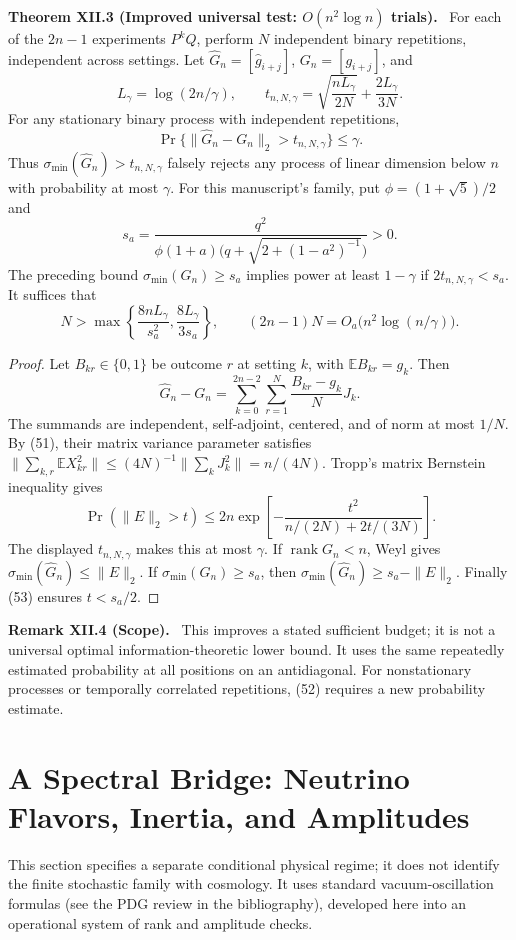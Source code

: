 \documentclass[11pt,a4paper,oneside]{book}
\DeclareMathOperator{\rank}{rank}\DeclareMathOperator{\Tr}{Tr}
\newcommand{\statement}[3]{\par\medskip\noindent\textbf{#1 #2 (#3).}\ }
\begin{document}
\statement{Theorem}{XII.3}{Improved universal test: $O(n^2\log n)$ trials} For each of the $2n-1$ experiments $P^kQ$, perform $N$ independent binary repetitions, independent across settings. Let $\widehat G_n=[\widehat g_{i+j}]$, $G_n=[g_{i+j}]$, and
\[L_\gamma=\log(2n/\gamma),\qquad t_{n,N,\gamma}=\sqrt{\frac{nL_\gamma}{2N}}+\frac{2L_\gamma}{3N}.\]
For any stationary binary process with independent repetitions,
\begin{equation}\Pr\{\|\widehat G_n-G_n\|_2>t_{n,N,\gamma}\}\le\gamma.\tag{52}\end{equation}
Thus $\sigma_{\min}(\widehat G_n)>t_{n,N,\gamma}$ falsely rejects any process of linear dimension below $n$ with probability at most $\gamma$. For this manuscript's family, put $\phi=(1+\sqrt5)/2$ and
\[s_a=\frac{q^2}{\phi(1+a)\bigl(q+\sqrt{2+(1-a^2)^{-1}}\bigr)}>0.\]
The preceding bound $\sigma_{\min}(G_n)\ge s_a$ implies power at least $1-\gamma$ if $2t_{n,N,\gamma}<s_a$. It suffices that
\begin{equation}N>\max\left\{\frac{8nL_\gamma}{s_a^2},\frac{8L_\gamma}{3s_a}\right\},\qquad(2n-1)N=O_a\bigl(n^2\log(n/\gamma)\bigr).\tag{53}\end{equation}
\begin{proof}Let $B_{kr}\in\{0,1\}$ be outcome $r$ at setting $k$, with $\mathbb EB_{kr}=g_k$. Then
\[\widehat G_n-G_n=\sum_{k=0}^{2n-2}\sum_{r=1}^N\frac{B_{kr}-g_k}{N}J_k.\]
The summands are independent, self-adjoint, centered, and of norm at most $1/N$. By (51), their matrix variance parameter satisfies $\|\sum_{k,r}\mathbb EX_{kr}^2\|\le(4N)^{-1}\|\sum_kJ_k^2\|=n/(4N)$. Tropp's matrix Bernstein inequality gives
\[\Pr(\|E\|_2>t)\le2n\exp\left[-\frac{t^2}{n/(2N)+2t/(3N)}\right].\]
The displayed $t_{n,N,\gamma}$ makes this at most $\gamma$. If $\rank G_n<n$, Weyl gives $\sigma_{\min}(\widehat G_n)\le\|E\|_2$. If $\sigma_{\min}(G_n)\ge s_a$, then $\sigma_{\min}(\widehat G_n)\ge s_a-\|E\|_2$. Finally (53) ensures $t<s_a/2$.\end{proof}
\statement{Remark}{XII.4}{Scope} This improves a stated sufficient budget; it is not a universal optimal information-theoretic lower bound. It uses the same repeatedly estimated probability at all positions on an antidiagonal. For nonstationary processes or temporally correlated repetitions, (52) requires a new probability estimate.
\setcounter{equation}{53}


\chapter{A Spectral Bridge: Neutrino Flavors, Inertia, and Amplitudes}
This section specifies a separate conditional physical regime; it does not identify the finite stochastic family with cosmology. It uses standard vacuum-oscillation formulas (see the PDG review in the bibliography), developed here into an operational system of rank and amplitude checks.
\end{document}
